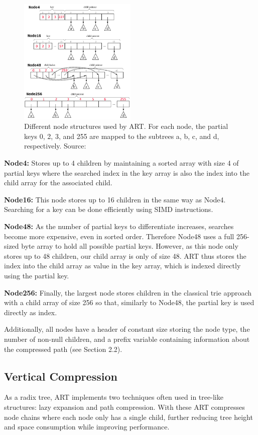 \documentclass[acmtog, nonacm]{acmart}
\begin{document}
\begin{figure}
    \centering
    \includegraphics[width=0.5\textwidth]{images/03-art-node-types.png}
    \caption{Different node structures used by ART. For each node, the partial keys 0, 2, 3, and 255 are mapped to the subtrees a, b, c, and d, respectively.
    Source: \cite{6544812}}
    \label{fig:trie-mem}
\end{figure}

\textbf{Node4:} Stores up to 4 children by maintaining a sorted array with size 4 of partial keys where the searched index 
in the key array is also the index into the child array for the associated child.

\textbf{Node16:} This node stores up to 16 children in the same way as Node4. Searching for a key can be done 
efficiently using SIMD instructions.

\textbf{Node48:} As the number of partial keys to differentiate increases, searches become more expensive, even in 
sorted order. Therefore Node48 uses a full 256-sized byte array to hold all possible partial keys. However, as this 
node only stores up to 48 children, our child array is only of size 48. ART thus stores the index into the 
child array as value in the key array, which is indexed directly using the partial key.

\textbf{Node256:} Finally, the largest node stores children in the classical trie approach with a child 
array of size 256 so that, similarly to Node48, the partial key is used directly as index.

Additionally, all nodes have a header of constant size storing the node type, the number of non-null children, 
and a prefix variable containing information about the compressed path (see Section 2.2).

\subsection{Vertical Compression}
As a radix tree, ART implements two techniques often used in tree-like structures: lazy expansion and path compression. 
With these ART compresses node chains where each node only has a single child, further reducing tree height and space 
consumption while improving performance.
\end{document}
